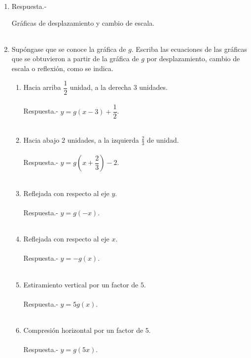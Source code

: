 \begin{enumerate}[\bfseries 1.]
\item Respuesta.-\;

Gráficas de desplazamiento y cambio de escala.\\\\

\item Supóngase que se conoce la gráfica de $g$. Escriba las ecuaciones de las gráficas que se obtuvieron a partir de la gráfica de $g$ por desplazamiento, cambio de escala o reflexión, como se indica.
\begin{enumerate}[\bfseries a)]

    \item Hacia arriba $\dfrac{1}{2}$ unidad, a la derecha $3$ unidades.\\\\
	Respuesta.-\; $y = g(x-3) + \dfrac{1}{2}$.\\\\

    \item Hacia abajo $2$ unidades, a la izquierda $\frac{2}{3}$ de unidad.\\\\
	Respuesta.-\; $y = g(x+\dfrac{2}{3}) - 2$.\\\\

    \item Reflejada con respecto al eje $y$.\\\\ 
	Respuesta.-\; $y = g(-x)$.\\\\

    \item Reflejada con respecto al eje $x$.\\\\ 
	Respuesta.-\; $y = -g(x)$.\\\\ 

    \item Estiramiento vertical por un factor de $5$.\\\\
	Respuesta.-\; $y = 5g(x)$.\\\\

    \item Compresión horizontal por un factor de $5$.\\\\
	Respuesta.-\; $y = g(5x)$.\\\\


\end{enumerate}
\end{enumerate}
